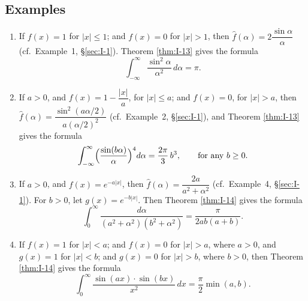 \subsection*{Examples}
\begin{enumerate}[label=\arabic*.,ref=\arabic*]
\item If $f(x)=1$ for $|x|\le 1$; and $f(x)=0$ for $|x|>1$, then
$\widehat f(\alpha)=2\dfrac{\sin\alpha}{\alpha}$ (cf.\ Example~1, \S\ref{sec:I-1}). Theorem \ref{thm:I-13} gives the formula
\begin{equation*}
\int_{-\infty}^{\infty}\frac{\sin^{2}\alpha}{\alpha^{2}}\,d\alpha=\pi.
\end{equation*}

\item If $a>0$, and $f(x)=1-\dfrac{|x|}{a}$, for $|x|\le a$; and $f(x)=0$, for $|x|>a$, then $\widehat f(\alpha)=\dfrac{\sin^{2}(a\alpha/2)}{a(\alpha/2)^{2}}$ (cf.\ Example~2, \S\ref{sec:I-1}), and Theorem \ref{thm:I-13} gives the formula
\begin{equation*}
\int_{-\infty}^{\infty}\Bigl(\frac{\sin(b\alpha)}{\alpha}\Bigr)^{4}d\alpha=\frac{2\pi}{3}\,b^{3},\qquad\text{for any }b\ge 0.
\end{equation*}

\item If $a>0$, and $f(x)=e^{-a|x|}$, then $\widehat f(\alpha)=\dfrac{2a}{a^{2}+\alpha^{2}}$ (cf.\ Example~4, \S\ref{sec:I-1}). For $b>0$, let $g(x)=e^{-b|x|}$. Then Theorem \ref{thm:I-14} gives the formula
\begin{equation*}
\int_{0}^{\infty}\frac{d\alpha}{(a^{2}+\alpha^{2})(b^{2}+\alpha^{2})}=\frac{\pi}{2ab(a+b)}.
\end{equation*}

\item If $f(x)=1$ for $|x|<a$; and $f(x)=0$ for $|x|>a$, where $a>0$, and $g(x)=1$ for $|x|<b$; and $g(x)=0$ for $|x|>b$, where $b>0$, then Theorem \ref{thm:I-14} gives the formula
\begin{equation*}
\int_{0}^{\infty}\frac{\sin(ax)\cdot\sin(bx)}{x^{2}}\,dx=\frac{\pi}{2}\min(a,b).
\end{equation*}
\end{enumerate}

